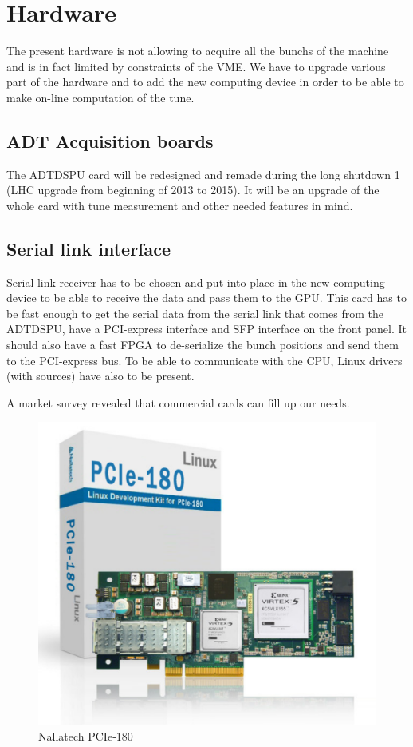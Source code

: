 \section{Hardware}

The present hardware is not allowing to acquire all the \glspl{bunch} of the machine and is in fact limited by constraints of the \gls{VME}. We have to upgrade various part of the hardware and to add the new computing device in order to be able to make on-line computation of the tune.

\subsection{ADT Acquisition boards}

The ADTDSPU card will be redesigned and remade during the long shutdown 1 (LHC upgrade from beginning of 2013 to 2015). It will be an upgrade of the whole card with tune measurement and other needed features in mind.

\subsection{Serial link interface}

Serial link receiver has to be chosen and put into place in the new computing device to be able to receive the data and pass them to the \gls{GPU}. This card has to be fast enough to get the serial data from the serial link that comes from the ADTDSPU, have a PCI-express interface and \gls{SFP} interface on the front panel. It should also have a fast FPGA to de-serialize the bunch positions and send them to the PCI-express bus. To be able to communicate with the CPU, Linux drivers (with sources) have also to be present.

A market survey revealed that commercial cards can fill up our needs.

\begin{figure}[H]
\caption{Nallatech PCIe-180}
\label{fig:nallatech}
\centering
\includegraphics[scale=0.3]{Nallatech_PCIe-180.pdf}
\end{figure}

